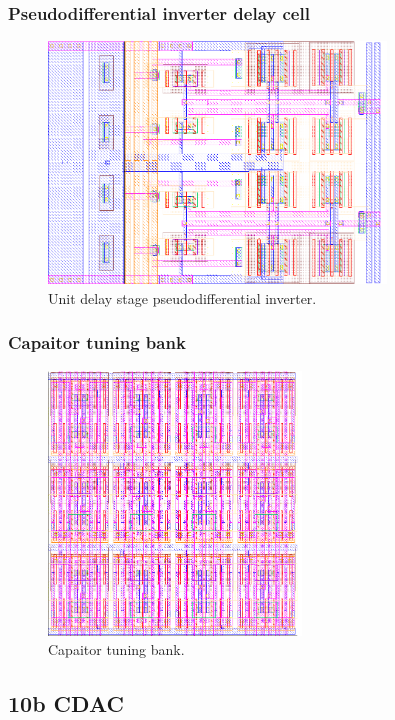 			\subsubsection{Pseudodifferential inverter delay cell}
				\begin{figure}[htb!]
				        \centering
				        \includegraphics[width=0.8\textwidth, angle=0]{./figs/layout/layout_ro_pseudodiff_inv}
				    \caption{Unit delay stage pseudodifferential inverter.}
				\end{figure}
			\FloatBarrier
			\subsubsection{Capaitor tuning bank}
				\begin{figure}[htb!]
				        \centering
				        \includegraphics[width=0.6\textwidth, angle=0]{./figs/layout/layout_pvt_bank}
				    \caption{Capaitor tuning bank.}
				\end{figure}
		\FloatBarrier\pagebreak
		\subsection{10b CDAC}
